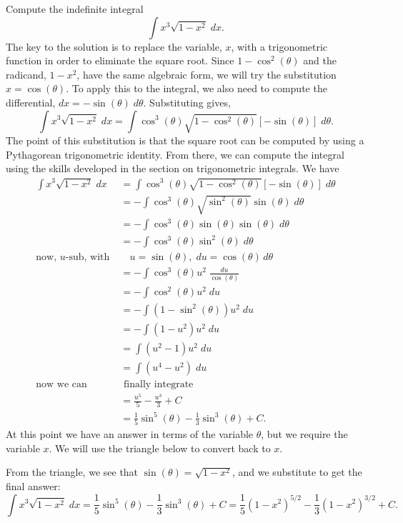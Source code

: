 \documentclass{ximera}
\begin{document}
\begin{example}
Compute the indefinite integral
\[
\int x^3 \sqrt{1-x^2} \; dx.
\]
The key to the solution is to replace the variable, $x$, with a trigonometric function 
in order to eliminate the square root.
Since $1-\cos^2(\theta)$ and the radicand, $1-x^2$,
have the same algebraic form, we will try the substitution $x = \cos(\theta)$.
To apply this to the integral, we also need to compute the differential, 
$dx = -\sin(\theta) \; d\theta$.
Substituting gives,
\[
\int x^3 \sqrt{1-x^2} \; dx = \int \cos^3(\theta) \sqrt{1-\cos^2(\theta)} [-\sin(\theta)] \; d\theta.
\]
The point of this substitution is that the square root can be computed by
using a
Pythagorean trigonometric identity. From there, we can compute the integral
using the skills developed in the section on trigonometric integrals.
We have
\begin{align*}
\int x^3 \sqrt{1-x^2} \; dx &= \int \cos^3(\theta) \sqrt{1-\cos^2(\theta)} [-\sin(\theta)] \; d\theta\\
                           &= -\int \cos^3(\theta) \sqrt{\sin^2(\theta)} \sin(\theta) \; d\theta\\
                           &= -\int \cos^3(\theta) \sin(\theta) \sin(\theta) \; d\theta\\
                           &= -\int \cos^3(\theta) \sin^2(\theta) \; d\theta\\
                           \text{now, $u$-sub, with} \; & \; \text{  $u = \sin(\theta), \; du = \cos(\theta) \, d\theta$}\\
                           &=-\int \cos^3(\theta) u^2 \; \frac{du}{\cos(\theta)}\\
                           &=-\int \cos^2(\theta) u^2 \; du\\
                           &=-\int (1-\sin^2(\theta)) u^2 \; du\\
                           &=-\int (1-u^2)u^2 \; du\\
                           &=\int (u^2 -1)u^2 \; du\\
                           &=\int (u^4 - u^2) \; du\\
                           \text{now we can} & \text{ finally integrate}\\
                           &=\frac{u^5}{5} - \frac{u^3}{3} + C\\
                           &= \frac15 \sin^5(\theta) - \frac13 \sin^3(\theta) + C.
\end{align*}
At this point we have an answer in terms of the variable $\theta$, but we require the variable $x$.
We will use the triangle below to convert back to $x$.


From the triangle, we see that $\sin(\theta) = \sqrt{1 - x^2}$, and we substitute
to get the final answer:
\[
\int x^3 \sqrt{1-x^2} \; dx = \frac15 \sin^5(\theta) - \frac13 \sin^3(\theta) + C = \frac15 (1-x^2)^{5/2} - \frac13 (1-x^2)^{3/2} + C.
\]

\end{example}
\end{document}
